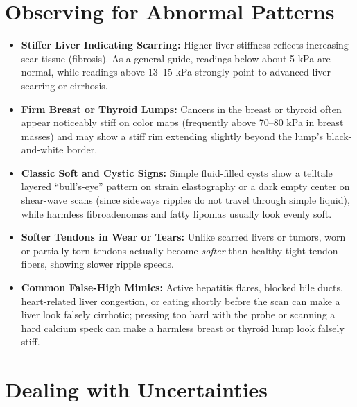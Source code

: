 \section{Observing for Abnormal Patterns}

\begin{itemize}
    \item \textbf{Stiffer Liver Indicating Scarring:} Higher liver stiffness reflects increasing scar tissue (fibrosis). As a general guide, readings below about 5 kPa are normal, while readings above 13--15 kPa strongly point to advanced liver scarring or cirrhosis.
    \item \textbf{Firm Breast or Thyroid Lumps:} Cancers in the breast or thyroid often appear noticeably stiff on color maps (frequently above 70--80 kPa in breast masses) and may show a stiff rim extending slightly beyond the lump's black-and-white border.
    \item \textbf{Classic Soft and Cystic Signs:} Simple fluid-filled cysts show a telltale layered ``bull's-eye'' pattern on strain elastography or a dark empty center on shear-wave scans (since sideways ripples do not travel through simple liquid), while harmless fibroadenomas and fatty lipomas usually look evenly soft.
    \item \textbf{Softer Tendons in Wear or Tears:} Unlike scarred livers or tumors, worn or partially torn tendons actually become \emph{softer} than healthy tight tendon fibers, showing slower ripple speeds.
    \item \textbf{Common False-High Mimics:} Active hepatitis flares, blocked bile ducts, heart-related liver congestion, or eating shortly before the scan can make a liver look falsely cirrhotic; pressing too hard with the probe or scanning a hard calcium speck can make a harmless breast or thyroid lump look falsely stiff.
\end{itemize}

\section{Dealing with Uncertainties}

